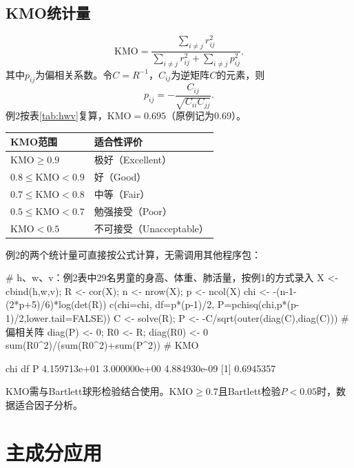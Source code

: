 \subsection{KMO统计量}
\begin{equation}
\mathrm{KMO}=\frac{\sum_{i\ne j}r_{ij}^{2}}{\sum_{i\ne j}r_{ij}^{2}+\sum_{i\ne j}p_{ij}^{2}}.
\end{equation}
其中$p_{ij}$为偏相关系数。令$C=R^{-1}$，$C_{ij}$为逆矩阵$C$的元素，则
\[
p_{ij}=-\frac{C_{ij}}{\sqrt{C_{ii}C_{jj}}}.
\]
例2按表\ref{tab:hwv}复算，KMO$=0.695$（原例记为0.69）。
\begin{center}
\begin{tabular}{ll}\toprule
{\bfseries KMO范围}&{\bfseries 适合性评价}\\\midrule
$\mathrm{KMO}\geqslant0.9$&极好（Excellent）\\
$0.8\leqslant\mathrm{KMO}<0.9$&好（Good）\\
$0.7\leqslant\mathrm{KMO}<0.8$&中等（Fair）\\
$0.5\leqslant\mathrm{KMO}<0.7$&勉强接受（Poor）\\
$\mathrm{KMO}<0.5$&不可接受（Unacceptable）\\\bottomrule
\end{tabular}
\end{center}
例2的两个统计量可直接按公式计算，无需调用其他程序包：
\par\noindent\begin{rcode}
# h、w、v：例2表中29名男童的身高、体重、肺活量，按例1的方式录入
X <- cbind(h,w,v); R <- cor(X); n <- nrow(X); p <- ncol(X)
chi <- -(n-1-(2*p+5)/6)*log(det(R))
c(chi=chi, df=p*(p-1)/2, P=pchisq(chi,p*(p-1)/2,lower.tail=FALSE))
C <- solve(R); P <- -C/sqrt(outer(diag(C),diag(C)))   # 偏相关阵
diag(P) <- 0; R0 <- R; diag(R0) <- 0
sum(R0^2)/(sum(R0^2)+sum(P^2))                        # KMO
\end{rcode}
\begin{routput}
         chi           df            P 
4.159713e+01 3.000000e+00 4.884930e-09 
[1] 0.6945357
\end{routput}
KMO需与Bartlett球形检验结合使用。$\mathrm{KMO}\geqslant0.7$且Bartlett检验$P<0.05$时，数据适合因子分析。
\section{主成分应用}
